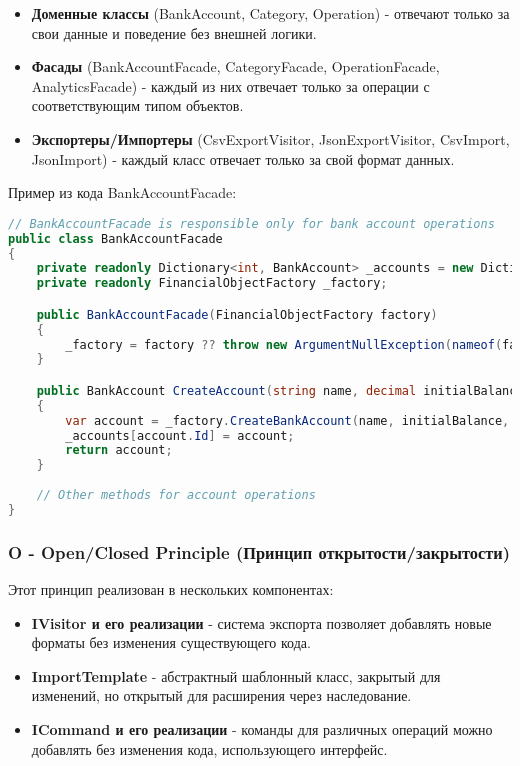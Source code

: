 \documentclass[12pt,a4paper]{article}
\begin{document}
\begin{itemize}
    \item \textbf{Доменные классы} (BankAccount, Category, Operation) - отвечают только за свои данные и поведение без внешней логики.
    \item \textbf{Фасады} (BankAccountFacade, CategoryFacade, OperationFacade, AnalyticsFacade) - каждый из них отвечает только за операции с соответствующим типом объектов.
    \item \textbf{Экспортеры/Импортеры} (CsvExportVisitor, JsonExportVisitor, CsvImport, JsonImport) - каждый класс отвечает только за свой формат данных.
\end{itemize}

Пример из кода BankAccountFacade:

\begin{lstlisting}[language=csharp]
// BankAccountFacade is responsible only for bank account operations
public class BankAccountFacade
{
    private readonly Dictionary<int, BankAccount> _accounts = new Dictionary<int, BankAccount>();
    private readonly FinancialObjectFactory _factory;

    public BankAccountFacade(FinancialObjectFactory factory)
    {
        _factory = factory ?? throw new ArgumentNullException(nameof(factory));
    }

    public BankAccount CreateAccount(string name, decimal initialBalance, AccountType type = AccountType.Checking)
    {
        var account = _factory.CreateBankAccount(name, initialBalance, type);
        _accounts[account.Id] = account;
        return account;
    }
    
    // Other methods for account operations
}
\end{lstlisting}

\subsubsection{O - Open/Closed Principle (Принцип открытости/закрытости)}

Этот принцип реализован в нескольких компонентах:

\begin{itemize}
    \item \textbf{IVisitor и его реализации} - система экспорта позволяет добавлять новые форматы без изменения существующего кода.
    \item \textbf{ImportTemplate} - абстрактный шаблонный класс, закрытый для изменений, но открытый для расширения через наследование.
    \item \textbf{ICommand и его реализации} - команды для различных операций можно добавлять без изменения кода, использующего интерфейс.
\end{itemize}
\end{document}

